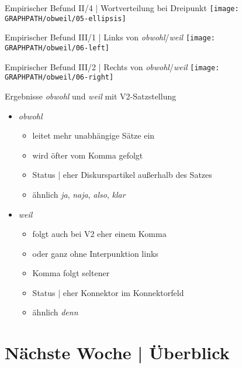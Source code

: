 \begin{frame}
  {Empirischer Befund II/4 | Wortverteilung bei Dreipunkt}
  \centering 
  \texttt{[image: \\GRAPHPATH/obweil/05-ellipsis]}
\end{frame}

\begin{frame}
  {Empirischer Befund III/1 | Links von \textit{obwohl}\slash \textit{weil}}
  \centering 
  \texttt{[image: \\GRAPHPATH/obweil/06-left]}
\end{frame}

\begin{frame}
  {Empirischer Befund III/2 | Rechts von \textit{obwohl}\slash \textit{weil}}
  \centering 
  \texttt{[image: \\GRAPHPATH/obweil/06-right]}
\end{frame}

\begin{frame}
  {Ergebnisse}
  \textit{obwohl} und \textit{weil} mit V2-Satzstellung\\
  \Zeile
  \begin{itemize}[<+->]
    \item \textit{obwohl}
      \begin{itemize}[<+->]
        \item leitet mehr unabhängige Sätze ein
        \item wird öfter vom Komma gefolgt
        \item Status | \alert{eher Diskurspartikel außerhalb des Satzes}
        \item ähnlich \textit{ja}, \textit{naja}, \textit{also}, \textit{klar}
      \end{itemize}
      \Zeile
    \item \textit{weil}
      \begin{itemize}[<+->]
        \item folgt auch bei V2 eher einem Komma
        \item oder ganz ohne Interpunktion links
        \item Komma folgt seltener
        \item Status | \alert{eher Konnektor im Konnektorfeld}
        \item ähnlich \textit{denn}
      \end{itemize}
  \end{itemize}
\end{frame}



\ifdefined\TITLE
  \section{Nächste Woche | Überblick}


